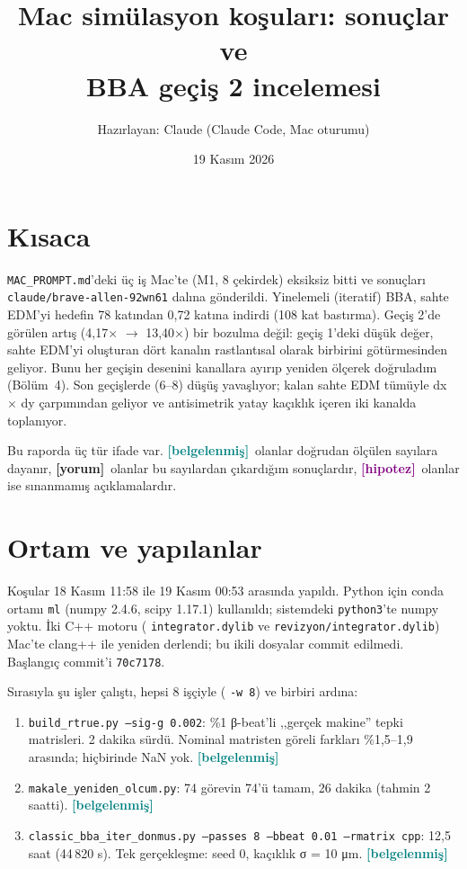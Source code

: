 \documentclass[11pt,a4paper]{article}
\title{Mac simülasyon koşuları: sonuçlar ve\\ BBA geçiş 2 incelemesi}
\author{Hazırlayan: Claude (Claude Code, Mac oturumu)}
\date{19 Kasım 2026}
\newcommand{\bel}{\textcolor{teal}{\textbf{\footnotesize [belgelenmiş]}}}
\newcommand{\yor}{\textcolor{orange!80!black}{\textbf{\footnotesize [yorum]}}}
\newcommand{\hip}{\textcolor{purple}{\textbf{\footnotesize [hipotez]}}}
\newcommand{\kod}[1]{{\XeTeXinterchartokenstate=0 \texttt{#1}}}
\begin{document}
\maketitle

\section*{Kısaca}
\kod{MAC\_PROMPT.md}'deki üç iş Mac'te (M1, 8 çekirdek) eksiksiz bitti ve sonuçları
\kod{claude/brave-allen-92wn61} dalına gönderildi. Yinelemeli (iteratif) BBA, sahte EDM'yi
hedefin 78 katından 0{,}72 katına indirdi (108 kat bastırma). Geçiş 2'de görülen artış
(4{,}17$\times$ $\to$ 13{,}40$\times$) bir bozulma değil: geçiş 1'deki düşük değer, sahte EDM'yi
oluşturan dört kanalın rastlantısal olarak birbirini götürmesinden geliyor. Bunu her geçişin
desenini kanallara ayırıp yeniden ölçerek doğruladım (Bölüm~4). Son geçişlerde (6--8) düşüş yavaşlıyor; kalan sahte EDM tümüyle dx $\times$ dy çarpımından geliyor ve antisimetrik yatay kaçıklık içeren iki kanalda toplanıyor.

Bu raporda üç tür ifade var. \bel\ olanlar doğrudan ölçülen sayılara dayanır,
\yor\ olanlar bu sayılardan çıkardığım sonuçlardır, \hip\ olanlar ise sınanmamış
açıklamalardır.

\section{Ortam ve yapılanlar}
Koşular 18 Kasım 11:58 ile 19 Kasım 00:53 arasında yapıldı. Python için conda ortamı
\kod{ml} (numpy 2.4.6, scipy 1.17.1) kullanıldı; sistemdeki \kod{python3}'te numpy yoktu.
İki C++ motoru (\kod{integrator.dylib} ve \kod{revizyon/integrator.dylib}) Mac'te clang++ ile
yeniden derlendi; bu ikili dosyalar commit edilmedi. Başlangıç commit'i \kod{70c7178}.

Sırasıyla şu işler çalıştı, hepsi 8 işçiyle (\kod{-w 8}) ve birbiri ardına:
\begin{enumerate}
\item \kod{build\_rtrue.py --sig-g 0.002}: \%1 β-beat'li ,,gerçek makine'' tepki matrisleri.
  2 dakika sürdü. Nominal matristen göreli farkları \%1{,}5--1{,}9 arasında; hiçbirinde NaN yok. \bel
\item \kod{makale\_yeniden\_olcum.py}: 74 görevin 74'ü tamam, 26 dakika (tahmin 2 saatti). \bel
\item \kod{classic\_bba\_iter\_donmus.py --passes 8 --bbeat 0.01 --rmatrix cpp}: 12{,}5 saat
  (44\,820 s). Tek gerçekleşme: seed 0, kaçıklık σ = 10 μm. \bel
\end{enumerate}
\end{document}
